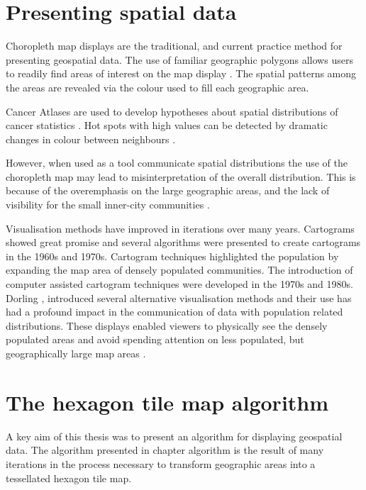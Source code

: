 \documentclass{monashthesis}
\begin{document}
\hypertarget{presenting-spatial-data}{%
\section{Presenting spatial data}\label{presenting-spatial-data}}

Choropleth map displays are the traditional, and current practice method for presenting geospatial data. The use of familiar geographic polygons allows users to readily find areas of interest on the map display \autocite{EI}. The spatial patterns among the areas are revealed via the colour used to fill each geographic area.

Cancer Atlases are used to develop hypotheses about spatial distributions of cancer statistics \autocite{CPISACA}. Hot spots with high values can be detected by dramatic changes in colour between neighbours \autocite{MACM}.

However, when used as a tool communicate spatial distributions the use of the choropleth map may lead to misinterpretation of the overall distribution. This is because of the overemphasis on the large geographic areas, and the lack of visibility for the small inner-city communities \autocite{ACTUC}.

Visualisation methods have improved in iterations over many years. Cartograms \autocite{ACCAC} showed great promise and several algorithms were presented to create cartograms in the 1960s and 1970s. Cartogram techniques highlighted the population by expanding the map area of densely populated communities.
The introduction of computer assisted cartogram techniques were developed in the 1970s and 1980s. Dorling \autocite{TVSSS}, \autocite{ACTUC} introduced several alternative visualisation methods and their use has had a profound impact in the communication of data with population related distributions. These displays enabled viewers to physically see the densely populated areas and avoid spending attention on less populated, but geographically large map areas \autocite{CTTMB}.

\hypertarget{the-hexagon-tile-map-algorithm}{%
\section{The hexagon tile map algorithm}\label{the-hexagon-tile-map-algorithm}}

A key aim of this thesis was to present an algorithm for displaying geospatial data. The algorithm presented in chapter algorithm is the result of many iterations in the process necessary to transform geographic areas into a tessellated hexagon tile map.
\end{document}
